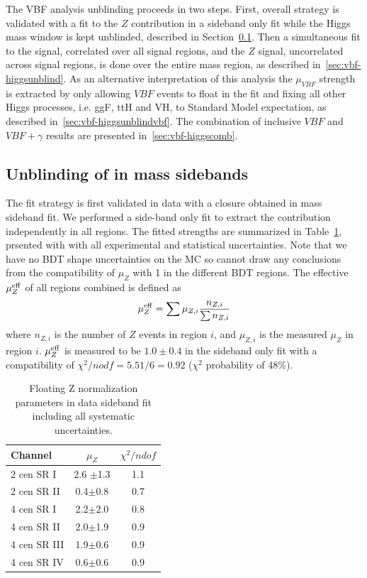 The VBF \Hbb analysis unblinding proceeds in two steps. First, overall strategy is validated with a fit to the $Z$ contribution in a sideband only fit while the Higgs mass window is kept unblinded, described in Section~\ref{sec:vbf-zunblind}.  Then a simultaneous fit to the signal, correlated over all signal regions, and the $Z$ signal, uncorrelated across signal regions, is done over the entire mass region, as described in~\ref{sec:vbf-higgsunblind}. As an alternative interpretation of this analysis the $\mu_{VBF}$ strength is extracted by only allowing $VBF$ events to float in the fit and fixing all other Higgs processes, i.e. ggF, ttH and VH, to Standard Model expectation, as described in~\ref{sec:vbf-higgsunblindvbf}. The combination of inclusive $VBF$ and $VBF+\gamma$ results are presented in~\ref{sec:vbf-higgscomb}.


\subsection{Unblinding of \zjets{} in mass sidebands}
\label{sec:vbf-zunblind}

The fit strategy is first validated in data with a closure obtained in \zjets{} mass sideband fit. We performed a side-band only fit to extract the \zjets{} contribution independently in all regions. The fitted \zjets{} strengths are summarized in Table~\ref{tab:zsidebandfit}, prsented with with all experimental and statistical uncertainties.   Note that we have no BDT shape uncertainties on the \zjets{} MC so cannot draw any conclusions from the compatibility of $\mu_Z$ with 1 in the different BDT regions. The effective $\mu_{Z}^{\rm eff}$ of all regions combined is defined as
\begin{equation}
\label{eqn:zsig}
\mu_{Z}^{\rm eff} = \sum \mu_{Z,i}\frac{n_{Z,i}}{\sum n_{Z,i}} 
\end{equation}
where $n_{Z,i}$ is the number of $Z$ events in region $i$, and $\mu_{Z,i}$ is the measured $\mu_Z$ in region $i$.  $\mu_{Z}^{\rm eff}$ is measured to be $1.0\pm 0.4$ in the sideband only fit with a compatibility of $\chi^2/nodf = 5.51/6=0.92$ ($\chi^2$ probability of 48\%).


\begin{table}[htbp]
\centering
\caption{Floating Z normalization parameters in data sideband fit including all systematic uncertainties.}
\label{tab:zsidebandfit}
\begin{tabular}{|l|c|c|}
\hline
Channel      & $\mu_{Z}$   & $\chi^2/ndof$ \\ \hline
2 cen SR I   & 2.6 $\pm$1.3  & 1.1          \\ \hline
2 cen SR II  & 0.4$\pm$0.8  & 0.7          \\ \hline
4 cen SR I   & 2.2$\pm$2.0  & 0.8          \\ \hline
4 cen SR II  & 2.0$\pm$1.9  & 0.9          \\ \hline
4 cen SR III & 1.9$\pm$0.6  & 0.9          \\ \hline
4 cen SR IV  & 0.6$\pm$0.6  & 0.9          \\ \hline
\end{tabular}
\end{table}



